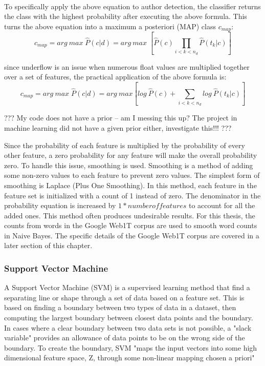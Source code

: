 			\paragraph{} To specifically apply the above equation to author detection, the classifier returns the class with the highest probability after executing the above formula.  This turns the above equation into a maximum a posteriori (MAP) class $c_{map}$:
				\begin{equation} c_{map} = arg \: max \; \hat{P}(c|d) = arg \: max \; [ \hat{P}(c) \prod_{i<k<n_d} \hat{P}(t_k|c) ] \end{equation}

			since underflow is an issue when numerous float values are multiplied together over a set of features, the practical application of the above formula is:
				\begin{equation} c_{map} = arg \: max \; \hat{P}(c|d) = arg \: max [ log \: \hat{P}(c) + \sum_{i<k<n_d} log \: \hat{P}(t_k|c) ] \end{equation}

			??? My code does not have a prior -- am I messing this up?  The project in machine learning did not have a given prior either, investigate this!!! ???
			
			Since the probability of each feature is multiplied by the probability of every other feature, a zero probability for any feature will make the overall probability zero.  To handle this issue, smoothing is used.  Smoothing is a method of adding some non-zero values to each feature to prevent zero values.  The simplest form of smoothing is Laplace (Plus One Smoothing).  In this method, each feature in the feature set is initialized with a count of 1 instead of zero.  The denominator in the probability equation is increased by $1 * number of features$ to account for all the added ones.  This method often produces undesirable results.  For this thesis, the counts from words in the Google Web1T corpus are used to smooth word counts in Naive Bayes.  The specific details of the Google Web1T corpus are covered in a later section of this chapter.

		\subsubsection{Support Vector Machine}
		A Support Vector Machine (SVM) is a supervised learning method that find a separating line or shape through a set of data based on a feature set.  This is based on finding a boundary between two types of data in a dataset, then computing the largest boundary between closest data points and the boundary.  In cases where a clear boundary between two data sets is not possible, a "slack variable" provides an allowance of data points to be on the wrong side of the boundary. To create the boundary, SVM "maps the input vectors into some high dimensional feature space, Z, through some non-linear mapping chosen a priori" \cite{vapnik_support-vector_1995}

